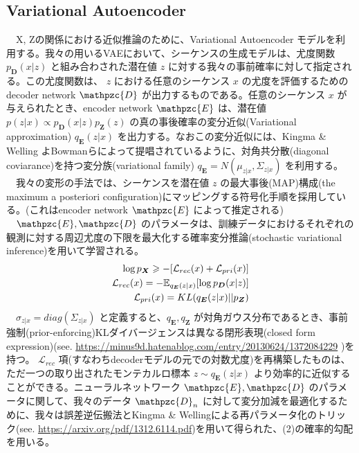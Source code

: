\documentclass{scrartcl}
\begin{document}
\subsection{Variational Autoencoder}
\label{sec:org77fee1a}
　X, Zの関係における近似推論のために、Variational Autoencoder モデルを利用する。我々の用いるVAEにおいて、シーケンスの生成モデルは、尤度関数 \(p_{\bm{D}}(x|z)\) と組み合わされた潜在値 \(z\) に対する我々の事前確率に対して指定される。この尤度関数は、 \(z\) における任意のシーケンス \(x\) の尤度を評価するための decoder network \(\mathpzc{D}\) が出力するものである。任意のシーケンス \(x\) が与えられたとき、encoder network \(\mathpzc{E}\) は、潜在値 \(p(z | x) \propto p_{\bm{D}}(x | z)p_{\bm{Z}}(z)\) の真の事後確率の変分近似(Variational approximation)  \(q_{\bm{E}}(z | x)\) を出力する。なおこの変分近似には、Kingma \& Welling よBowmanらによって提唱されているように、対角共分散(diagonal coviarance)を持つ変分族(variational family) \(q_{\bm{E}} = N(\mu_{z|x}, \Sigma_{z|x})\) を利用する。\\
　我々の変形の手法では、シーケンスを潜在値 \(z\) の最大事後(MAP)構成(the maximum a posteriori configuration)にマッピングする符号化手順を採用している。(これはencoder network \(\mathpzc{E}\) によって推定される)\\
　\(\mathpzc{E}, \mathpzc{D}\) のパラメータは、訓練データにおけるそれぞれの観測に対する周辺尤度の下限を最大化する確率変分推論(stochastic variational inference)を用いて学習される。\\
\begin{align}
\log p_{\bm{X}} \geqslant - [\mathcal{L}_{rec}(x) + \mathcal{L}_{pri}(x)] \\
\mathcal{L}_{rec}(x) = -\mathbb{E}_{q_{\bm{E}}(z|x)}[\log p_{\bm{D}}(x|z)] \notag \\
\mathcal{L}_{pri}(x) = KL(q_{\bm{E}}(z|x)||p_{\bm{Z}}) \notag
\end{align}
　\(\sigma_{z|x} = diag(\Sigma_{z|x})\) と定義すると、\(q_{\bm{E}}, q_{\bm{Z}}\) が対角ガウス分布であるとき、事前強制(prior-enforcing)KLダイバージェンスは異なる閉形表現(closed form expression)(see. \url{https://minus9d.hatenablog.com/entry/20130624/1372084229} )を持つ。 \(\mathcal{L}_{rec}\) 項(すなわちdecoderモデルの元での対数尤度)を再構築したものは、ただ一つの取り出されたモンテカルロ標本 \(z\sim q_{\bm{E}}(z|x)\) より効率的に近似することができる。ニューラルネットワーク \(\mathpzc{E}, \mathpzc{D}\) のパラメータに関して、我々のデータ \(\mathpzc{D}_n\) に対して変分加減を最適化するために、我々は誤差逆伝搬法とKingma \& Wellingによる再パラメータ化のトリック(see. \url{https://arxiv.org/pdf/1312.6114.pdf})を用いて得られた、(2)の確率的勾配を用いる。\\
\end{document}
